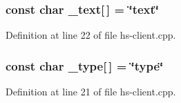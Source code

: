 \subsubsection[{\texorpdfstring{\+\_\+text}{_text}}]{\setlength{\rightskip}{0pt plus 5cm}const char \+\_\+text\mbox{[}$\,$\mbox{]} = \char`\"{}text\char`\"{}\hspace{0.3cm}{\ttfamily [static]}}\hypertarget{hs-client_8cpp_ad177811d47939fe9404de88672a980ab}{}\label{hs-client_8cpp_ad177811d47939fe9404de88672a980ab}


Definition at line 22 of file hs-\/client.\+cpp.

\subsubsection[{\texorpdfstring{\+\_\+type}{_type}}]{\setlength{\rightskip}{0pt plus 5cm}const char \+\_\+type\mbox{[}$\,$\mbox{]} = \char`\"{}type\char`\"{}\hspace{0.3cm}{\ttfamily [static]}}\hypertarget{hs-client_8cpp_a1c24b43242df87f75631175c75afdcda}{}\label{hs-client_8cpp_a1c24b43242df87f75631175c75afdcda}


Definition at line 21 of file hs-\/client.\+cpp.

